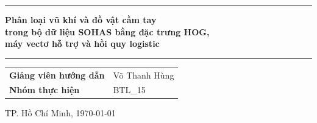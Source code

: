 \begin{titlepage}
\begin{center}
  \vspace{0.6cm}
  \rule{\linewidth}{0.4pt}
  \begin{singlespace}
    {\fontsize{17.28pt}{22pt}\selectfont\bfseries Phân loại vũ khí và đồ vật cầm tay\\
    trong bộ dữ liệu SOHAS bằng đặc trưng HOG,\\
    máy vectơ hỗ trợ và hồi quy logistic\par}
  \end{singlespace}
  \rule{\linewidth}{0.4pt}

  \vspace{0.6cm}
  \begin{tabular}{@{}ll@{}}
    \textbf{Giảng viên hướng dẫn} & Võ Thanh Hùng \\
    \textbf{Nhóm thực hiện} & BTL\_15 \\
  \end{tabular}
\end{center}

\vfill
\begin{center}
  TP. Hồ Chí Minh, \today
\end{center}
\end{titlepage}
\restoregeometry
